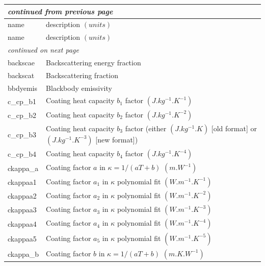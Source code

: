 \documentclass[a4paper,10pt]{report}
\begin{document}
\begin{center}
  \begin{longtable}{|l|l|}
    \hline
    \multicolumn{2}{|l|}{\small\sl continued from previous page} \\
    \hline name & description $(units)$ \\
    \hline \endhead
    \hline name & description $(units)$ \\
    \hline \endfirsthead
    \hline
    \multicolumn{2}{|l|}{\small\sl continued on next page} \\
    \hline \endfoot
    \endlastfoot
    backscae \index{b2plot, backscae}  & Backscattering energy fraction \\
    backscat \index{b2plot, backscat}  & Backscattering fraction \\
    bbdyemis \index{b2plot, bbdyemis}  & Blackbody emissivity \\
    c\_cp\_b1 \index{b2plot, c\_cp\_b1}  & Coating heat capacity $b_1$ factor $(J.kg^{-1}.K^{-1})$ \\
    c\_cp\_b2 \index{b2plot, c\_cp\_b2}  & Coating heat capacity $b_2$ factor $(J.kg^{-1}.K^{-2})$ \\
    c\_cp\_b3 \index{b2plot, c\_cp\_b3}  & Coating heat capacity $b_3$ factor (either $(J.kg^{-1}.K)$ [old format] or $(J.kg^{-1}.K^{-3})$ [new format]) \\
    c\_cp\_b4 \index{b2plot, c\_cp\_b4}  & Coating heat capacity $b_4$ factor $(J.kg^{-1}.K^{-4})$ \\
    ckappa\_a \index{b2plot, ckappa\_a}  & Coating factor $a$ in $\kappa=1/(aT+b)$ $(m.W^{-1})$ \\
    ckappaa1 \index{b2plot, ckappaa1} & Coating factor $a_1$ in $\kappa$ polynomial fit $(W.m^{-1}.K^{-1})$ \\
    ckappaa2 \index{b2plot, ckappaa2} & Coating factor $a_2$ in $\kappa$ polynomial fit $(W.m^{-1}.K^{-2})$ \\
    ckappaa3 \index{b2plot, ckappaa3} & Coating factor $a_3$ in $\kappa$ polynomial fit $(W.m^{-1}.K^{-3})$ \\
    ckappaa4 \index{b2plot, ckappaa4} & Coating factor $a_4$ in $\kappa$ polynomial fit $(W.m^{-1}.K^{-4})$ \\
    ckappaa5 \index{b2plot, ckappaa5} & Coating factor $a_5$ in $\kappa$ polynomial fit $(W.m^{-1}.K^{-5})$ \\
    ckappa\_b \index{b2plot, ckappa\_b}  & Coating factor $b$ in $\kappa=1/(aT+b)$ $(m.K.W^{-1})$ \\

\end{longtable}
\end{center}
\end{document}
